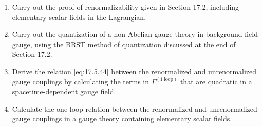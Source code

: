 

\begin{enumerate}
  \item Carry out the proof of renormalizability given in Section 17.2, including elementary scalar fields in the Lagrangian.

  \item Carry out the quantization of a non-Abelian gauge theory in background field gauge, using the BRST method of quantization discussed at the end of Section 17.2.

  \item Derive the relation \eqref{eq:17.5.44} between the renormalized and unrenormalized gauge couplings by calculating the terms in $\Gamma^{(1\ \mathrm{loop})}$ that are quadratic in a spacetime-dependent gauge field.

  \item Calculate the one-loop relation between the renormalized and unrenormalized gauge couplings in a gauge theory containing elementary scalar fields.
\end{enumerate}


